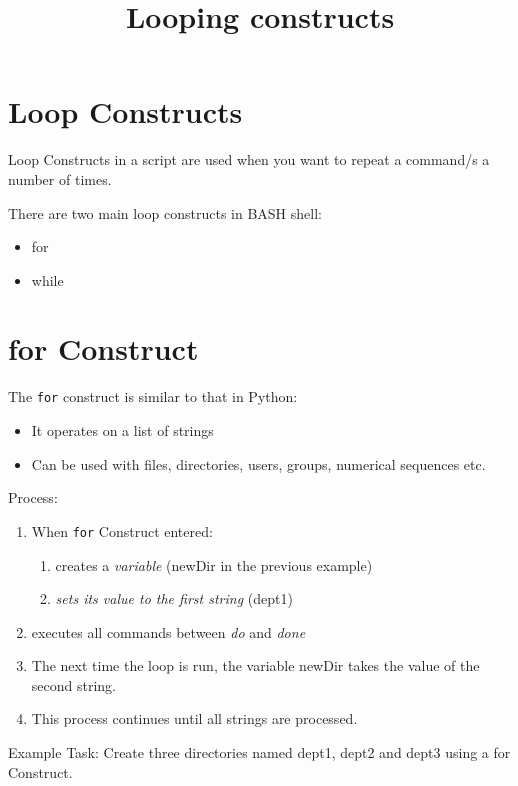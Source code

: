 \documentclass[slides]{pgnotes}
\title{Looping constructs}
\begin{document}
\maketitle

\tableofcontents


\section{Loop Constructs}\label{loop-constructs}

Loop Constructs in a script are used when you want to repeat a command/s a number of times.

There are two main loop constructs in BASH shell:
\begin{itemize}
\item for
\item while
\end{itemize}


\section{for Construct}\label{for-construct}

The \texttt{for} construct is similar to that in Python:
\begin{itemize}
\item It operates on a list of strings
\item Can be used with files, directories, users, groups, numerical sequences etc.
\end{itemize}
Process:
\begin{enumerate}
\item When \texttt{for} Construct entered:
  \begin{enumerate}
  \item creates a \emph{variable} (newDir in the previous example)
  \item \emph{sets its value to the first string} (dept1)
  \end{enumerate}
\item executes all commands between \emph{do} and \emph{done}  
\item  The next time the loop is run, the variable newDir takes the value of the second string.
\item This process continues until all strings are processed.  
\end{enumerate}

Example Task: Create three directories named dept1, dept2 and dept3
using a for Construct.
\end{document}
